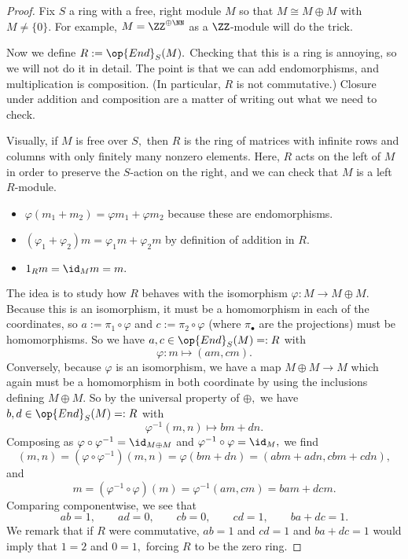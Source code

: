 \documentclass[../notes.tex]{subfiles}
\begin{document}
\begin{proof}
	Fix $S$ a ring with a free, right module $M$ so that $M\cong M\oplus M$ with $M\ne\{0\}.$ For example, $M=\ZZ^{\oplus\NN}$ as a $\ZZ$-module will do the trick.

	Now we define $R:=\op{End}_S(M).$ Checking that this is a ring is annoying, so we will not do it in detail. The point is that we can add endomorphisms, and multiplication is composition. (In particular, $R$ is not commutative.) Closure under addition and composition are a matter of writing out what we need to check.
	
	Visually, if $M$ is free over $S,$ then $R$ is the ring of matrices with infinite rows and columns with only finitely many nonzero elements. Here, $R$ acts on the left of $M$ in order to preserve the $S$-action on the right, and we can check that $M$ is a left $R$-module.
	\begin{itemize}
		\item $\varphi(m_1+m_2)=\varphi m_1+\varphi m_2$ because these are endomorphisms.
		\item $(\varphi_1+\varphi_2)m=\varphi_1m+\varphi_2m$ by definition of addition in $R.$
		\item $1_Rm=\id_Mm=m.$
	\end{itemize}
	The idea is to study how $R$ behaves with the isomorphism $\varphi:M\to M\oplus M.$ Because this is an isomorphism, it must be a homomorphism in each of the coordinates, so $a:=\pi_1\circ\varphi$ and $c:=\pi_2\circ\varphi$ (where $\pi_\bullet$ are the projections) must be homomorphisms. So we have $a,c\in\op{End}_S(M)=:R$ with
	\[\varphi:m\mapsto(am,cm).\]
	Conversely, because $\varphi$ is an isomorphism, we have a map $M\oplus M\to M$ which again must be a homomorphism in both coordinate by using the inclusions defining $M\oplus M.$ So by the universal property of $\oplus,$ we have $b,d\in\op{End}_S(M)=:R$ with
	\[\varphi^{-1}(m,n)\mapsto bm+dn.\]
	Composing as $\varphi\circ\varphi^{-1}=\id_{M\oplus M}$ and $\varphi^{-1}\circ\varphi=\id_M,$ we find
	\[(m,n)=\left(\varphi\circ\varphi^{-1}\right)(m,n)=\varphi(bm+dn)=(abm+adn,cbm+cdn),\]
	and
	\[m=\left(\varphi^{-1}\circ\varphi\right)(m)=\varphi^{-1}(am,cm)=bam+dcm.\]
	Comparing componentwise, we see that
	\[ab=1,\qquad ad=0,\qquad cb=0,\qquad cd=1,\qquad ba+dc=1.\]
	We remark that if $R$ were commutative, $ab=1$ and $cd=1$ and $ba+dc=1$ would imply that $1=2$ and $0=1,$ forcing $R$ to be the zero ring.
	

\end{proof}
\end{document}
